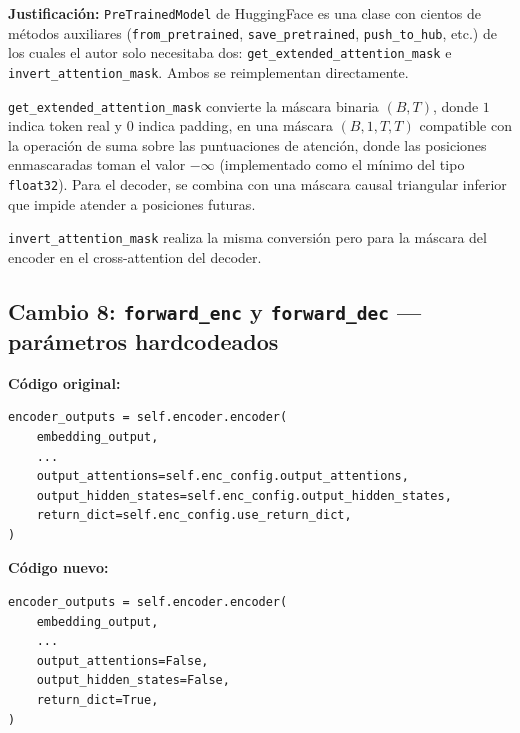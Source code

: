 \documentclass[12pt,a4paper]{article}
\begin{document}
\begin{notebox}
\textbf{Justificación:} \texttt{PreTrainedModel} de HuggingFace es una clase con
cientos de métodos auxiliares (\texttt{from\_pretrained}, \texttt{save\_pretrained},
\texttt{push\_to\_hub}, etc.) de los cuales el autor solo necesitaba dos:
\texttt{get\_extended\_attention\_mask} e \texttt{invert\_attention\_mask}. Ambos se
reimplementan directamente.

\texttt{get\_extended\_attention\_mask} convierte la máscara binaria $(B, T)$, donde
$1$ indica token real y $0$ indica padding, en una máscara $(B, 1, T, T)$ compatible
con la operación de suma sobre las puntuaciones de atención, donde las posiciones
enmascaradas toman el valor $-\infty$ (implementado como el mínimo del tipo
\texttt{float32}). Para el decoder, se combina con una máscara causal triangular
inferior que impide atender a posiciones futuras.

\texttt{invert\_attention\_mask} realiza la misma conversión pero para la máscara del
encoder en el cross-attention del decoder.
\end{notebox}

\subsection{Cambio 8: \texttt{forward\_enc} y \texttt{forward\_dec} --- parámetros hardcodeados}

\textbf{Código original:}
\begin{lstlisting}[caption={Lectura de parametros desde el config (version original)}]
encoder_outputs = self.encoder.encoder(
    embedding_output,
    ...
    output_attentions=self.enc_config.output_attentions,
    output_hidden_states=self.enc_config.output_hidden_states,
    return_dict=self.enc_config.use_return_dict,
)
\end{lstlisting}

\textbf{Código nuevo:}
\begin{lstlisting}[caption={Parametros hardcodeados (version corregida)}]
encoder_outputs = self.encoder.encoder(
    embedding_output,
    ...
    output_attentions=False,
    output_hidden_states=False,
    return_dict=True,
)
\end{lstlisting}
\end{document}
